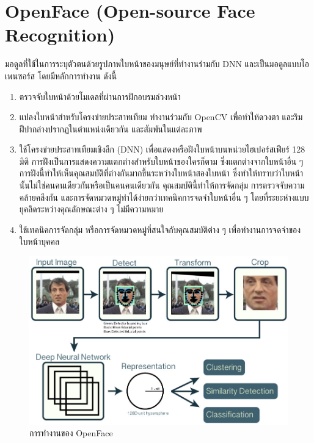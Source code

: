 \section{OpenFace (Open-source Face Recognition)}
มอดูลที่ใช้ในการระบุตัวตนด้วยรูปภาพใบหน้าของมนุษย์ที่ทำงานร่ามกับ DNN และเป็นมอดูลแบบโอเพนซอร์ส \cite{amos2016openface} โดยมีหลักการทำงาน ดังนี้
\begin{enumerate}
  \item ตรวจจับใบหน้าด้วยโมเดลที่ผ่านการฝึกอบรมล่วงหน้า
  \item แปลงใบหน้าสำหรับโครงข่ายประสาทเทียม ทำงานร่วมกับ OpenCV เพื่อทำให้ดวงตา และริมฝีปากล่างปรากฏในตำแหน่งเดียวกัน และสัมพันในแต่ละภาพ
  \item ใช้โครงข่ายประสาทเทียมเชิงลึก (DNN) เพื่อแสดงหรือฝังใบหน้าบนหน่วยไฮเปอร์สเฟียร์ 128 มิติ การฝังเป็นการแสดงความแตกต่างสำหรับใบหน้าของใครก็ตาม 
  ซึ่งแตกต่างจากใบหน้าอื่น ๆ การฝังนี้ทำให้เห็นคุณสมบัติที่ต่างกันมากขึ้นระหว่างใบหน้าสองใบหน้า ซึ่งทำให้ทราบว่าใบหน้านั้นไม่ใช่คนคนเดียวกันหรือเป็นคนคนเดียวกัน 
  คุณสมบัตินี้ทำให้การจัดกลุ่ม การตรวจจับความคล้ายคลึงกัน และการจัดหมวดหมู่ทำได้ง่ายกว่าเทคนิคการจดจำใบหน้าอื่น ๆ โดยที่ระยะห่างแบบยุคลิดระหว่างคุณลักษณะต่าง ๆ 
  ไม่มีความหมาย
  \item ใช้เทคนิคการจัดกลุ่ม หรือการจัดหมวดหมู่ที่สนใจกับคุณสมบัติต่าง ๆ เพื่อทำงานการจดจำของใบหน้าบุคคล 
\end{enumerate}  


\begin{figure}[!ht]
  \begin{center}
    \includegraphics[scale=.25]{pic/openface.jpg}
    \caption[การทำงานของ OpenFace]{การทำงานของ OpenFace}
    \label{fig:openface}
  \end{center}
\end{figure}



